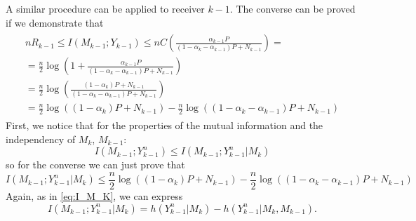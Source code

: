 A similar procedure can be applied to receiver $k-1$. The converse can be proved if we demonstrate that
\begin{align}
  \begin{split}
    nR_{k-1}\leq I(M_{k-1};Y_{k-1})\leq nC\left(\frac{\alpha_{k-1} P}{\left(1-\alpha_k-\alpha_{k-1}\right)P + N_{k-1}}\right) = \\
    = \frac{n}{2}\log\left(1+\frac{\alpha_{k-1} P}{\left(1-\alpha_k-\alpha_{k-1}\right)P + N_{k-1}}\right)\\
    = \frac{n}{2}\log\left(\frac{(1-\alpha_{k})P+N_{k-1} }{\left(1-\alpha_k-\alpha_{k-1}\right)P + N_{k-1}}\right)\\
    = \frac{n}{2}\log\left((1-\alpha_{k})P+N_{k-1}\right)-\frac{n}{2}\log\left(\left(1-\alpha_k-\alpha_{k-1}\right)P + N_{k-1}\right)
  \end{split}
\end{align}
First, we notice that for the properties of the mutual information and the independency of $M_k$, $M_{k-1}$:
\begin{equation}
  I(M_{k-1};Y^n_{k-1})\leq I(M_{k-1};Y^n_{k-1}|M_k)
\end{equation}
so for the converse we can just prove that
\begin{equation}
  I(M_{k-1};Y^n_{k-1}|M_k)\leq \frac{n}{2}\log\left((1-\alpha_{k})P+N_{k-1}\right)-\frac{n}{2}\log\left(\left(1-\alpha_k-\alpha_{k-1}\right)P + N_{k-1}\right)
  \label{eq:I_M-1_K-1}
\end{equation}
Again, as in \eqref{eq:I_M_K}, we can express
\begin{equation}
  I(M_{k-1};Y^n_{k-1}|M_k) = h(Y_{k-1}^n|M_{k}) - h(Y_{k-1}^n|M_k,M_{k-1}).
  \label{eq:I_M_K-1_I_K-1|Mk}
\end{equation}
